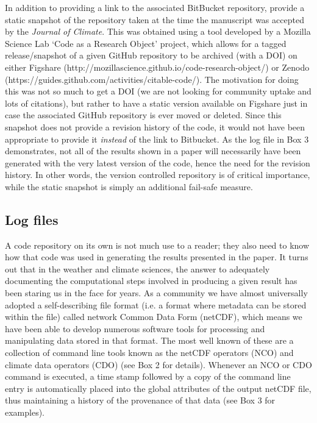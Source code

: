 In addition to providing a link to the associated BitBucket repository, \citet{Irving2015} provide a static snapshot of the repository taken at the time the manuscript was accepted by the \textit{Journal of Climate}. This was obtained using a tool developed by a Mozilla Science Lab `Code as a Research Object' project, which allows for a tagged release/snapshot of a given GitHub repository to be archived (with a DOI) on either Figshare (http://mozillascience.github.io/code-research-object/) or Zenodo (https://guides.github.com/activities/citable-code/). The motivation for doing this was not so much to get a DOI (we are not looking for community uptake and lots of citations), but rather to have a static version available on Figshare just in case the associated GitHub repository is ever moved or deleted. Since this snapshot does not provide a revision history of the code, it would not have been appropriate to provide it \textit{instead} of the link to Bitbucket. As the log file in Box 3 demonstrates, not all of the results shown in a paper will necessarily have been generated with the very latest version of the code, hence the need for the revision history. In other words, the version controlled repository is of critical importance, while the static snapshot is simply an additional fail-safe measure.  

\subsection{Log files}\label{s:log_files}

A code repository on its own is not much use to a reader; they also need to know how that code was used in generating the results presented in the paper. It turns out that in the weather and climate sciences, the answer to adequately documenting the computational steps involved in producing a given result has been staring us in the face for years. As a community we have almost universally adopted a self-describing file format (i.e. a format where metadata can be stored within the file) called network Common Data Form (netCDF), which means we have been able to develop numerous software tools for processing and manipulating data stored in that format. The most well known of these are a collection of command line tools known as the netCDF operators (NCO) and climate data operators (CDO) (see Box 2 for details). Whenever an NCO or CDO command is executed, a time stamp followed by a copy of the command line entry is automatically placed into the global attributes of the output netCDF file, thus maintaining a history of the provenance of that data (see Box 3 for examples).

